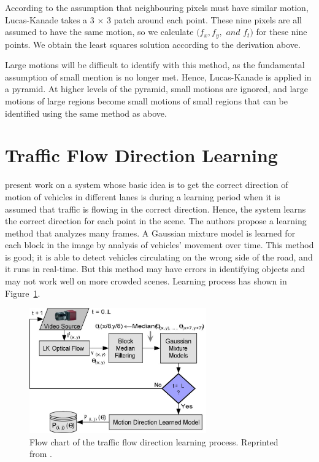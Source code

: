 According to the assumption that neighbouring pixels must have similar motion, Lucas-Kanade takes a 3 $ \times $ 3 patch around each point. These nine pixels are all assumed to have the same motion, so we calculate  $ (f_x,f_y,$ $ and $ $ f_t) $ for these nine points. We obtain the least squares solution according to the derivation above.

Large motions will be difficult to identify with this method, as the fundamental assumption of small mention is no longer met. Hence, Lucas-Kanade is applied in a pyramid. At higher levels of the pyramid, small motions are ignored, and large motions of large regions become small motions of small regions that can be identified using the same method as above.

\section{Traffic Flow Direction Learning}
 present work on a system whose basic idea is to get the correct direction of motion of vehicles in different lanes is during a learning period when it is assumed that traffic is flowing in the correct direction. Hence, the system learns the correct direction for each point in the scene. The authors propose a learning method that analyzes many frames. A Gaussian mixture model is learned for each block in the image by analysis of vehicles' movement over time. This method is good; it is able to detect vehicles circulating on the wrong side of the road, and it runs in real-time. But this method may have errors in identifying objects and may not work well on more crowded scenes. Learning process has shown in Figure~\ref{fig:learning}.
 

\begin{figure}[t]
  \centering
  \includegraphics[width=3in]{figures/learning.jpg}  
  \caption[Learning flow chart]{Flow chart of the traffic flow direction learning process. Reprinted from  . }
  \label{fig:learning}
\end{figure}




